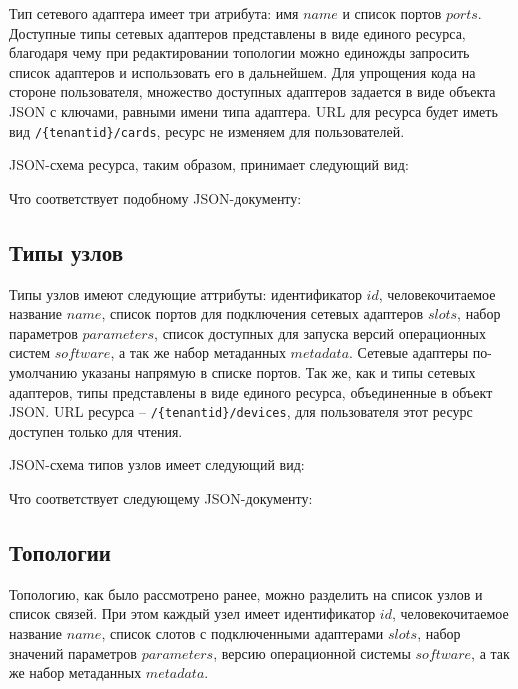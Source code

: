 Тип сетевого адаптера имеет три атрибута: имя $name$ и список портов $ports$. 
Доступные типы сетевых адаптеров представлены
в виде единого ресурса, благодаря чему при редактировании топологии можно единожды
запросить список адаптеров и использовать его в дальнейшем.  Для упрощения кода на стороне 
пользователя, множество доступных адаптеров задается в виде объекта JSON с ключами,
равными имени типа адаптера. URL для ресурса будет иметь вид \verb`/{tenantid}/cards`, ресурс не изменяем
для пользователей. 

JSON-схема ресурса, таким образом, принимает следующий вид:



Что соответствует подобному JSON-документу:




\subsection{Типы узлов}

Типы узлов имеют следующие аттрибуты: идентификатор $id$, человекочитаемое название
$name$, список портов для подключения сетевых адаптеров $slots$, 
набор параметров $parameters$, список доступных для запуска версий операционных систем 
$software$, а так же набор метаданных $metadata$. Сетевые адаптеры
по-умолчанию указаны напрямую в списке портов.
Так же, как и типы сетевых адаптеров, типы представлены в виде единого ресурса, объединенные в 
объект JSON. URL ресурса -- \verb`/{tenantid}/devices`, для пользователя этот ресурс доступен только 
для чтения.

JSON-схема типов узлов имеет следующий вид:



Что соответствует следующему JSON-документу:




\subsection{Топологии}

Топологию, как было рассмотрено ранее, можно разделить на список узлов и список 
связей. При этом каждый узел имеет идентификатор $id$, человекочитаемое название
$name$, список слотов с подключенными адаптерами $slots$, 
набор значений параметров $parameters$, версию операционной системы $software$, 
а так же набор метаданных $metadata$. 

